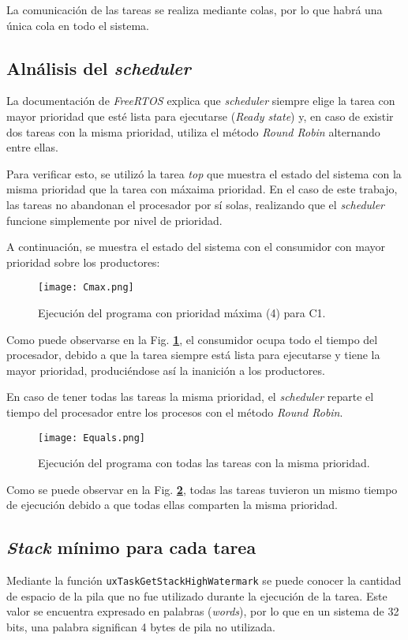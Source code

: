 \documentclass[12pt,a4paper]{article}
\begin{document}
La comunicación de las tareas se realiza mediante colas\cite{queue}, por lo que
habrá una única cola en todo el sistema.

\subsection{Alnálisis del \emph{scheduler}}
\label{sched}
La documentación de \emph{FreeRTOS} explica que \emph{scheduler} siempre elige
la tarea con mayor prioridad que esté lista para ejecutarse (\emph{Ready state})
y, en caso de existir dos tareas con la misma prioridad, utiliza el método
\emph{Round Robin} alternando entre ellas.

Para verificar esto, se utilizó la tarea \emph{top} que muestra el estado del
sistema con la misma prioridad que la tarea con máxaima prioridad. En el caso de
este trabajo, las tareas no abandonan el procesador por sí solas, realizando
que el \emph{scheduler} funcione simplemente por nivel de prioridad.

A continuación, se muestra el estado del sistema con el consumidor con mayor
prioridad sobre los productores:

\begin{figure}[H]
  \centering
  \texttt{[image: Cmax.png]}
  \caption{Ejecución del programa con prioridad máxima (4) para C1.}
  \label{cmax}
\end{figure}

\newpage
Como puede observarse en la Fig. \textbf{\ref{cmax}}, el consumidor ocupa todo
el tiempo del procesador, debido a que la tarea siempre está lista para
ejecutarse y tiene la mayor prioridad, produciéndose así la inanición a los
productores.

En caso de tener todas las tareas la misma prioridad, el \emph{scheduler} reparte
el tiempo del procesador entre los procesos con el método \emph{Round Robin}.

\begin{figure}[H]
  \centering
  \texttt{[image: Equals.png]}
  \caption{Ejecución del programa con todas las tareas con la misma prioridad.}
  \label{equals}
\end{figure}

Como se puede observar en la Fig. \textbf{\ref{equals}}, todas las tareas
tuvieron un mismo tiempo de ejecución debido a que todas ellas comparten la
misma prioridad.

\subsection{\emph{Stack} mínimo para cada tarea}
\label{minstack}
Mediante la función \verb|uxTaskGetStackHighWatermark| se puede conocer la
cantidad de espacio de la pila que no fue utilizado durante la ejecución de la
tarea. Este valor se encuentra expresado en palabras (\emph{words})\cite{water},
por lo que en un sistema de 32 bits, una palabra significan 4 bytes de pila no
utilizada.
\end{document}
